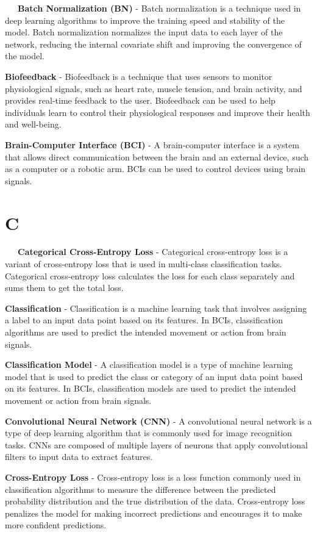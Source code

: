 \-\ \-\ \-\ \textbf{Batch Normalization (BN)} - Batch normalization is a technique used in deep learning algorithms to improve the training speed and stability of the model. Batch normalization normalizes the input data to each layer of the network, reducing the internal covariate shift and improving the convergence of the model.

\textbf{Biofeedback} - Biofeedback is a technique that uses sensors to monitor physiological signals, such as heart rate, muscle tension, and brain activity, and provides real-time feedback to the user. Biofeedback can be used to help individuals learn to control their physiological responses and improve their health and well-being.

\textbf{Brain-Computer Interface (BCI)} - A brain-computer interface is a system that allows direct communication between the brain and an external device, such as a computer or a robotic arm. BCIs can be used to control devices using brain signals.

\section*{C}

\-\ \-\ \-\ \textbf{Categorical Cross-Entropy Loss} - Categorical cross-entropy loss is a variant of cross-entropy loss that is used in multi-class classification tasks. Categorical cross-entropy loss calculates the loss for each class separately and sums them to get the total loss.

\textbf{Classification} - Classification is a machine learning task that involves assigning a label to an input data point based on its features. In BCIs, classification algorithms are used to predict the intended movement or action from brain signals.

\textbf{Classification Model} - A classification model is a type of machine learning model that is used to predict the class or category of an input data point based on its features. In BCIs, classification models are used to predict the intended movement or action from brain signals.

\textbf{Convolutional Neural Network (CNN)} - A convolutional neural network is a type of deep learning algorithm that is commonly used for image recognition tasks. CNNs are composed of multiple layers of neurons that apply convolutional filters to input data to extract features.

\textbf{Cross-Entropy Loss} - Cross-entropy loss is a loss function commonly used in classification algorithms to measure the difference between the predicted probability distribution and the true distribution of the data. Cross-entropy loss penalizes the model for making incorrect predictions and encourages it to make more confident predictions.

